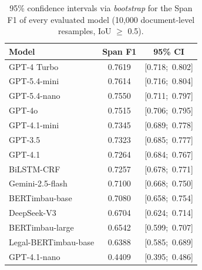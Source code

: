 \begin{table}[ht]
    \centering
    \caption{95\% confidence intervals via \textit{bootstrap} for the Span F1 of every evaluated model (10,000 document-level resamples, IoU $\geq$ 0.5).}
    \label{tab:bootstrap_ic}
    \small
    \begin{tabular}{lcc}
        \hline
        \textbf{Model} & \textbf{Span F1} & \textbf{95\% CI} \\
        \hline
        GPT-4 Turbo                         & 0.7619 & [0.718;\ 0.802] \\
        GPT-5.4-mini                        & 0.7614 & [0.716;\ 0.804] \\
        GPT-5.4-nano                        & 0.7550 & [0.711;\ 0.797] \\
        GPT-4o                              & 0.7515 & [0.706;\ 0.795] \\
        GPT-4.1-mini                        & 0.7345 & [0.689;\ 0.778] \\
        GPT-3.5                             & 0.7323 & [0.685;\ 0.777] \\
        GPT-4.1                             & 0.7264 & [0.684;\ 0.767] \\
        BiLSTM-CRF                          & 0.7257 & [0.678;\ 0.771] \\
        Gemini-2.5-flash                    & 0.7100 & [0.668;\ 0.750] \\
        BERTimbau-base                      & 0.7080 & [0.658;\ 0.754] \\
        DeepSeek-V3                         & 0.6704 & [0.624;\ 0.714] \\
        BERTimbau-large                     & 0.6542 & [0.599;\ 0.707] \\
        Legal-BERTimbau-base                & 0.6388 & [0.585;\ 0.689] \\
        GPT-4.1-nano                        & 0.4409 & [0.395;\ 0.486] \\
        \hline
    \end{tabular}
\end{table}
